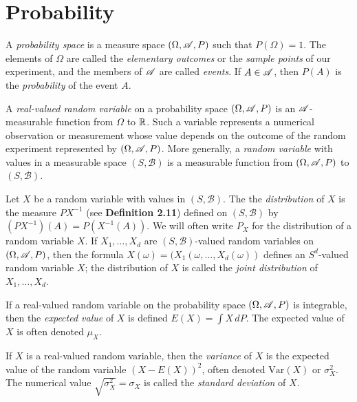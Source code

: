 \documentclass[12pt]{article}
\begin{document}
\section{Probability}
\begin{definition}
    A \textit{probability space} is a measure space $(\Omega,\mathscr{A},P)$ such that $P(\Omega)=1$. The elements of $\Omega$ are called the \textit{elementary outcomes} or the \textit{sample points} of our experiment, and the members of $\mathscr{A}$ are called \textit{events}. If $A\in\mathscr{A}$, then $P(A)$ is the \textit{probability} of the event $A$.
\end{definition}
\begin{definition}
    A \textit{real-valued random variable} on a probability space $(\Omega,\mathscr{A},P)$ is an $\mathscr{A}$-measurable function from $\Omega$ to $\mathbb{R}$. Such a variable represents a numerical observation or measurement whose value depends on the outcome of the random experiment represented by $(\Omega,\mathscr{A},P)$. More generally, a \textit{random variable} with values in a measurable space $(S,\mathscr{B})$ is a measurable function from $(\Omega,\mathscr{A},P)$ to $(S,\mathscr{B})$.
\end{definition}
\begin{definition}[Distribution]
    Let $X$ be a random variable with values in $(S,\mathscr{B})$. The the \textit{distribution} of $X$ is the measure $PX^{-1}$ (see \textbf{Definition 2.11}) defined on $(S,\mathscr{B})$ by  $(PX^{-1})(A)=P(X^{-1}(A))$. We will often write $P_X$ for the distribution of a random variable $X$. If $X_1,\dots,X_d$ are $(S,\mathscr{B})$-valued random variables on $(\Omega,\mathscr{A},P)$, then the formula $X(\omega)=(X_1(\omega,\dots,X_d(\omega))$ defines an $S^d$-valued random variable $X$; the distribution of $X$ is called the \textit{joint distribution} of $X_1,\dots,X_d$.
\end{definition}
\begin{definition}
    If a real-valued random variable on the probability space $(\Omega,\mathscr{A},P)$ is integrable, then the \textit{expected value} of $X$ is defined $E(X)=\int X\,dP$. The expected value of $X$ is often denoted $\mu_X$.
\end{definition}
\begin{definition}[Variance]
    If $X$ is a real-valued random variable, then the \textit{variance} of $X$ is the expected value of the random variable $(X-E(X))^2$, often denoted $\text{Var}(X)$ or $\sigma_X^2$. The numerical value $\sqrt{\sigma_X^2}=\sigma_X$ is called the \textit{standard deviation} of $X$.
\end{definition}
\end{document}
